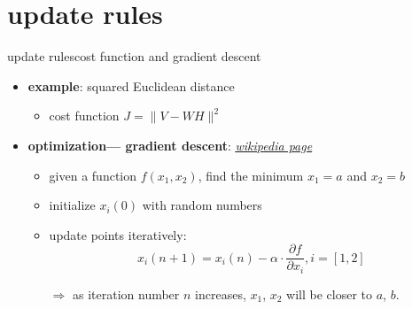     \section[update rules]{update rules}
        \begin{frame}{update rules}{cost function and gradient descent}
            \begin{itemize}
                \item \textbf{example}: squared Euclidean distance
                   \begin{itemize} 
                        \item  cost function $J = \parallel V - WH\parallel^{2}$
                   \end{itemize}			   			   

               \item<2->  \textbf{optimization--- gradient descent}: \href{https://en.wikipedia.org/wiki/Gradient_descent}{\underline{\textit{wikipedia page}}}
                       \begin{itemize}
                            \item  given a function $f(x_{1}, x_{2})$, find the minimum $x_{1} = a$ and $x_{2} = b$
                            \item  initialize $x_{i}(0)$ with random numbers
                            \item  update points iteratively:  
                                     \begin{equation*}
                                         x_{i}(n+1) = x_{i}(n) - \alpha \cdot \frac{\partial f}{\partial x_{i}},  i = [1, 2]
                                     \end{equation*}
                            \item[$\Rightarrow$] as iteration number $n$ increases, $x_{1}$, $x_{2}$ will be closer to $a$, $b$.
                       \end{itemize}			   			   
            \end{itemize}
        \end{frame}    
          
